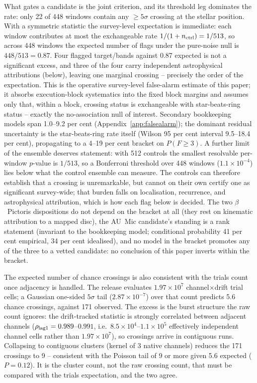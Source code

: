 \documentclass{openjournal}
\begin{document}
What gates a candidate is the joint criterion, and its threshold leg
dominates the rate: only 22 of 448 windows contain any $\geq5\sigma$
crossing at the stellar position. With a symmetric statistic the
survey-level expectation is immediate: each window contributes at most
the exchangeable rate $1/(1+n_{\rm ctrl})=1/513$, so across 448
windows the expected number of flags under the pure-noise null is
$448/513=0.87$. Four flagged target/bands against 0.87 expected is not
a significant excess, and three of the four carry independent
astrophysical attributions (below), leaving one marginal crossing --
precisely the order of the expectation. This is the
operative survey-level false-alarm estimate of this paper; it absorbs
execution-block systematics into the fixed block margins and assumes
only that, within a block, crossing status is exchangeable with
star-beats-ring status -- exactly the no-association null of
interest. Secondary bookkeeping models span 1.0--9.2 per cent
(Appendix~\ref{app:falsealarm}); the dominant residual uncertainty is
the star-beats-ring rate itself (Wilson 95 per cent interval 9.5--18.4
per cent), propagating to a 4--19 per cent bracket on $P(F\geq3)$.
A further limit of the ensemble deserves statement: with 512
controls the smallest resolvable per-window $p$-value is $1/513$, so a
Bonferroni threshold over 448 windows ($1.1\times10^{-4}$) lies below
what the control ensemble can measure. The controls can therefore
establish that a crossing is unremarkable, but cannot on their own
certify one as significant survey-wide; that burden falls on
localisation, recurrence, and astrophysical attribution, which is how
each flag below is decided. The two $\beta$~Pictoris dispositions do not depend on the
bracket at all (they rest on kinematic attribution to a mapped disc),
the AU~Mic candidate's standing is a rank statement (invariant to the
bookkeeping model; conditional probability 41 per cent empirical, 34
per cent idealised), and no model in the bracket promotes any of the
three to a vetted candidate: no conclusion of this paper inverts
within the bracket.

The expected number of chance crossings is also consistent with the
trials count once adjacency is handled. The release evaluates
$1.97\times10^{7}$ channel$\times$drift trial cells; a Gaussian
one-sided $5\sigma$ tail ($2.87\times10^{-7}$) over that count
predicts 5.6 chance crossings, against 171 observed. The excess is
the burst structure the raw count ignores: the drift-tracked
statistic is strongly correlated between adjacent channels
($\rho_{\rm lag1}=0.989$--$0.991$, i.e.\ $8.5\times10^{4}$--$1.1\times10^{5}$
effectively independent channel cells rather than
$1.97\times10^{7}$), so crossings arrive in contiguous runs.
Collapsing to contiguous clusters (kernel of 3 native channels)
reduces the 171 crossings to 9 -- consistent with the Poisson tail of
9 or more given 5.6 expected ($P=0.12$). It is the cluster count, not
the raw crossing count, that must be compared with the trials
expectation, and the two agree.
\end{document}
